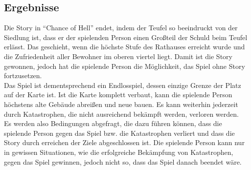 \documentclass[paper=A4,pagesize=auto,12pt,headinclude=true,footinclude=true,BCOR=0mm,DIV=calc]{scrartcl}
\newcommand{\sectionspace}{
	\vspace{0.5cm}
}
\newcommand{\gametitle}{Chance of Hell}
\begin{document}
\subsection{Ergebnisse}\label{sec:Ergebnisse}
Die Story in "`\gametitle"' endet, indem der Teufel so beeindruckt von der Siedlung ist, dass er der spielenden Person einen Großteil der Schuld beim Teufel erlässt. Das geschieht, wenn die höchste Stufe des Rathauses erreicht wurde und die Zufriedenheit aller Bewohner im oberen viertel liegt. Damit ist die Story gewonnen, jedoch hat die spielende Person die Möglichkeit, das Spiel ohne Story fortzusetzen.\\ 
Das Spiel ist dementsprechend ein Endlosspiel, dessen einzige Grenze der Platz auf der Karte ist. Ist die Karte komplett verbaut, kann die spielende Person höchstens alte Gebäude abreißen und neue bauen. Es kann weiterhin jederzeit durch Katastrophen, die nicht ausreichend bekämpft werden, verloren werden.\\
Es werden also Bedingungen abgefragt, die dazu führen können, dass die spielende Person gegen das Spiel bzw. die Katastrophen verliert und dass die Story durch erreichen der Ziele abgeschlossen ist. Die spielende Person kann nur in gewissen Situationen, wie die erfolgreiche Bekämpfung von Katastrophen, gegen das Spiel gewinnen, jedoch nicht so, dass das Spiel danach beendet wäre.


\sectionspace
\newpage
\printbibliography[heading=bibnumbered, title=Referenzen]\label{sec:Referenzen}
\end{document}

